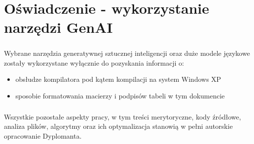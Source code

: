 \documentclass[12pt]{report}
\begin{document}
	\chapter{Oświadczenie - wykorzystanie narzędzi GenAI}
	\paragraph{}
	Wybrane narzędzia generatywnej sztucznej inteligencji oraz duże modele językowe zostały wykorzystane wyłącznie do pozyskania informacji o:
	\begin{itemize}
		\item obsłudze kompilatora pod kątem kompilacji na system Windows XP
		\item sposobie formatowania macierzy i podpisów tabeli w tym dokumencie
	\end{itemize}
	
	\paragraph{}
	Wszystkie pozostałe aspekty pracy, w tym treści merytoryczne, kody źródłowe, analiza plików, algorytmy oraz ich optymalizacja stanowią w pełni autorskie opracowanie Dyplomanta.
	
\end{document}
